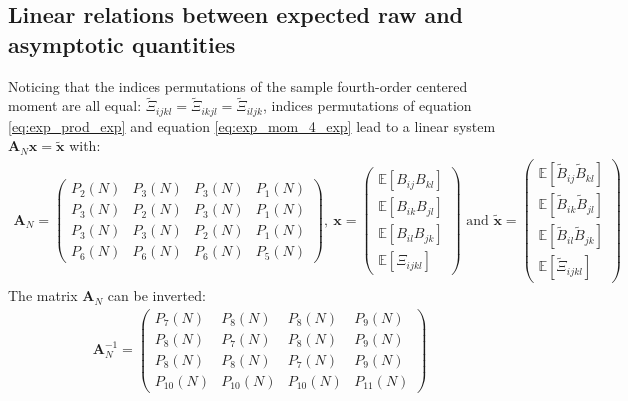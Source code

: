 \documentclass[12pt]{scrartcl}
\begin{document}
\subsection{Linear relations between expected raw and asymptotic quantities}
Noticing that the indices permutations of the sample fourth-order centered moment are all equal: $\widetilde{\Xi}_{ijkl} = \widetilde{\Xi}_{ikjl} = \widetilde{\Xi}_{iljk}$, indices permutations of equation \eqref{eq:exp_prod_exp} and equation \eqref{eq:exp_mom_4_exp} lead to a linear system $\mathbf{A}_N \mathbf{x} = \widetilde{\mathbf{x}}$ with:
\begin{align}
\mathbf{A}_N = \left( \begin{array}{cccc}
P_2(N) & P_3(N) & P_3(N) & P_1(N) \\
P_3(N) & P_2(N) & P_3(N) & P_1(N) \\
P_3(N) & P_3(N) & P_2(N) & P_1(N) \\
P_6(N) & P_6(N) & P_6(N) & P_5(N)
\end{array} \right) , \ 
\mathbf{x} = \left( \begin{array}{c}
\mathbb{E} \left[B_{ij} B_{kl}\right] \\
\mathbb{E} \left[B_{ik} B_{jl}\right] \\
\mathbb{E} \left[B_{il} B_{jk}\right] \\
\mathbb{E} \left[\Xi_{ijkl}\right]
\end{array} \right) \text{ and }
\widetilde{\mathbf{x}} = \left( \begin{array}{c}
\mathbb{E} \left[\widetilde{B}_{ij} \widetilde{B}_{kl}\right] \\
\mathbb{E} \left[\widetilde{B}_{ik} \widetilde{B}_{jl}\right] \\
\mathbb{E} \left[\widetilde{B}_{il} \widetilde{B}_{jk}\right] \\
\mathbb{E} \left[\widetilde{\Xi}_{ijkl}\right]
\end{array} \right) \nonumber
\end{align}
The matrix $\mathbf{A}_N$ can be inverted:
\begin{align}
\label{eq:invert_lin_sys}
\mathbf{A}_N^{-1} = \left( \begin{array}{cccc}
P_7(N) & P_8(N) & P_8(N) & P_9(N) \\
P_8(N) & P_7(N) & P_8(N) & P_9(N) \\
P_8(N) & P_8(N) & P_7(N) & P_9(N) \\
P_{10}(N) & P_{10}(N) & P_{10}(N) & P_{11}(N)
\end{array} \right)
\end{align}
\end{document}
